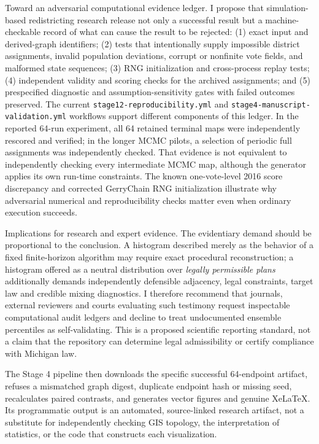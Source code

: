 \documentclass[
  10pt,
]{article}
\begin{document}
Toward an adversarial computational evidence ledger. I propose that
simulation-based redistricting research release not only a successful
result but a machine-checkable record of what can cause the result to be
rejected: (1) exact input and derived-graph identifiers; (2) tests that
intentionally supply impossible district assignments, invalid population
deviations, corrupt or nonfinite vote fields, and malformed state
sequences; (3) RNG initialization and cross-process replay tests; (4)
independent validity and scoring checks for the archived assignments;
and (5) prespecified diagnostic and assumption-sensitivity gates with
failed outcomes preserved. The current
\texttt{stage12-reproducibility.yml} and
\texttt{stage4-manuscript-validation.yml} workflows support different
components of this ledger. In the reported 64-run experiment, all 64
retained terminal maps were independently rescored and verified; in the
longer MCMC pilots, a selection of periodic full assignments was
independently checked. That evidence is not equivalent to independently
checking every intermediate MCMC map, although the generator applies its
own run-time constraints. The known one-vote-level 2016 score
discrepancy and corrected GerryChain RNG initialization illustrate why
adversarial numerical and reproducibility checks matter even when
ordinary execution succeeds.

Implications for research and expert evidence. The evidentiary demand
should be proportional to the conclusion. A histogram described merely
as the behavior of a fixed finite-horizon algorithm may require exact
procedural reconstruction; a histogram offered as a neutral distribution
over \emph{legally permissible plans} additionally demands independently
defensible adjacency, legal constraints, target law and credible mixing
diagnostics. I therefore recommend that journals, external reviewers
and courts evaluating such testimony request inspectable computational
audit ledgers and decline to treat undocumented ensemble percentiles as
self-validating. This is a proposed scientific reporting standard, not a
claim that the repository can determine legal admissibility or certify
compliance with Michigan law.

The Stage 4 pipeline then downloads the specific successful 64-endpoint
artifact, refuses a mismatched graph digest, duplicate endpoint hash or
missing seed, recalculates paired contrasts, and generates vector
figures and genuine XeLaTeX. Its programmatic output is an automated,
source-linked research artifact, not a substitute for independently
checking GIS topology, the interpretation of statistics, or the code
that constructs each visualization.
\end{document}
